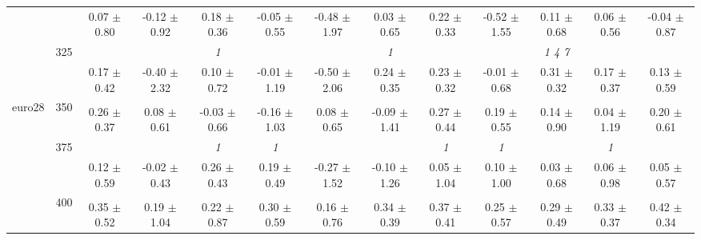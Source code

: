 \begin{table}[h]
{\begin{tabular}{
        ccccccccccccc}
 & & 0.07 $\pm$ 0.80& -0.12 $\pm$ 0.92& 0.18 $\pm$ 0.36& -0.05 $\pm$ 0.55& -0.48 $\pm$ 1.97& 0.03 $\pm$ 0.65& 0.22 $\pm$ 0.33& -0.52 $\pm$ 1.55& 0.11 $\pm$ 0.68& 0.06 $\pm$ 0.56& -0.04 $\pm$ 0.87 \\ 
 & \multirow{2}{*}{325}& \cellcolor[HTML]{EFEFEF} & \cellcolor[HTML]{EFEFEF} & \cellcolor[HTML]{EFEFEF} \textit{ 1 }& \cellcolor[HTML]{EFEFEF} & \cellcolor[HTML]{EFEFEF} & \cellcolor[HTML]{EFEFEF} \textit{ 1 }& \cellcolor[HTML]{EFEFEF} & \cellcolor[HTML]{EFEFEF} & \cellcolor[HTML]{EFEFEF} \textit{ 1 4 7 }& \cellcolor[HTML]{EFEFEF} & \cellcolor[HTML]{EFEFEF}  \\ 
 & & \cellcolor[HTML]{EFEFEF} 0.17 $\pm$ 0.42& \cellcolor[HTML]{EFEFEF} -0.40 $\pm$ 2.32& \cellcolor[HTML]{EFEFEF} 0.10 $\pm$ 0.72& \cellcolor[HTML]{EFEFEF} -0.01 $\pm$ 1.19& \cellcolor[HTML]{EFEFEF} -0.50 $\pm$ 2.06& \cellcolor[HTML]{EFEFEF} 0.24 $\pm$ 0.35& \cellcolor[HTML]{EFEFEF} 0.23 $\pm$ 0.32& \cellcolor[HTML]{EFEFEF} -0.01 $\pm$ 0.68& \cellcolor[HTML]{EFEFEF} 0.31 $\pm$ 0.32& \cellcolor[HTML]{EFEFEF} 0.17 $\pm$ 0.37& \cellcolor[HTML]{EFEFEF} 0.13 $\pm$ 0.59 \\ 
 \multirow{4}{*}{euro28} & \multirow{2}{*}{350}& & & & & & & & & & &  \\ 
 & & 0.26 $\pm$ 0.37& 0.08 $\pm$ 0.61& -0.03 $\pm$ 0.66& -0.16 $\pm$ 1.03& 0.08 $\pm$ 0.65& -0.09 $\pm$ 1.41& 0.27 $\pm$ 0.44& 0.19 $\pm$ 0.55& 0.14 $\pm$ 0.90& 0.04 $\pm$ 1.19& 0.20 $\pm$ 0.61 \\ 
 & \multirow{2}{*}{375}& \cellcolor[HTML]{EFEFEF} & \cellcolor[HTML]{EFEFEF} & \cellcolor[HTML]{EFEFEF} \textit{ 1 }& \cellcolor[HTML]{EFEFEF} \textit{ 1 }& \cellcolor[HTML]{EFEFEF} & \cellcolor[HTML]{EFEFEF} & \cellcolor[HTML]{EFEFEF} \textit{ 1 }& \cellcolor[HTML]{EFEFEF} \textit{ 1 }& \cellcolor[HTML]{EFEFEF} & \cellcolor[HTML]{EFEFEF} \textit{ 1 }& \cellcolor[HTML]{EFEFEF}  \\ 
 & & \cellcolor[HTML]{EFEFEF} 0.12 $\pm$ 0.59& \cellcolor[HTML]{EFEFEF} -0.02 $\pm$ 0.43& \cellcolor[HTML]{EFEFEF} 0.26 $\pm$ 0.43& \cellcolor[HTML]{EFEFEF} 0.19 $\pm$ 0.49& \cellcolor[HTML]{EFEFEF} -0.27 $\pm$ 1.52& \cellcolor[HTML]{EFEFEF} -0.10 $\pm$ 1.26& \cellcolor[HTML]{EFEFEF} 0.05 $\pm$ 1.04& \cellcolor[HTML]{EFEFEF} 0.10 $\pm$ 1.00& \cellcolor[HTML]{EFEFEF} 0.03 $\pm$ 0.68& \cellcolor[HTML]{EFEFEF} 0.06 $\pm$ 0.98& \cellcolor[HTML]{EFEFEF} 0.05 $\pm$ 0.57 \\ 
 & \multirow{2}{*}{400}& & & & & & & & & & &  \\ 
 & & 0.35 $\pm$ 0.52& 0.19 $\pm$ 1.04& 0.22 $\pm$ 0.87& 0.30 $\pm$ 0.59& 0.16 $\pm$ 0.76& 0.34 $\pm$ 0.39& 0.37 $\pm$ 0.41& 0.25 $\pm$ 0.57& 0.29 $\pm$ 0.49& 0.33 $\pm$ 0.37& 0.42 $\pm$ 0.34 \\ 

\end{tabular}}
\end{table}
